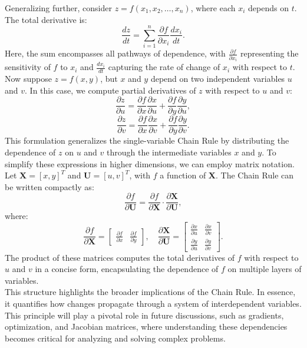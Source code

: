 \noindent Generalizing further, consider \( z = f(x_1, x_2, \ldots, x_n) \), where each \( x_i \) depends on \( t \). The total derivative is:
\[
\frac{dz}{dt} = \sum_{i=1}^n \frac{\partial f}{\partial x_i} \frac{dx_i}{dt}.
\]
Here, the sum encompasses all pathways of dependence, with \( \frac{\partial f}{\partial x_i} \) representing the sensitivity of \( f \) to \( x_i \) and \( \frac{dx_i}{dt} \) capturing the rate of change of \( x_i \) with respect to \( t \). Now suppose \( z = f(x, y) \), but \( x \) and \( y \) depend on two independent variables \( u \) and \( v \). In this case, we compute partial derivatives of \( z \) with respect to \( u \) and \( v \):
\[
\frac{\partial z}{\partial u} = \frac{\partial f}{\partial x} \frac{\partial x}{\partial u} + \frac{\partial f}{\partial y} \frac{\partial y}{\partial u},
\]
\[
\frac{\partial z}{\partial v} = \frac{\partial f}{\partial x} \frac{\partial x}{\partial v} + \frac{\partial f}{\partial y} \frac{\partial y}{\partial v}.
\]
This formulation generalizes the single-variable Chain Rule by distributing the dependence of \( z \) on \( u \) and \( v \) through the intermediate variables \( x \) and \( y \). To simplify these expressions in higher dimensions, we can employ matrix notation. Let \( \mathbf{X} = [x, y]^T \) and \( \mathbf{U} = [u, v]^T \), with \( f \) a function of \( \mathbf{X} \). The Chain Rule can be written compactly as:
\[
\frac{\partial f}{\partial \mathbf{U}} = \frac{\partial f}{\partial \mathbf{X}} \cdot \frac{\partial \mathbf{X}}{\partial \mathbf{U}},
\]
where:
\[
\frac{\partial f}{\partial \mathbf{X}} = \begin{bmatrix} \frac{\partial f}{\partial x} & \frac{\partial f}{\partial y} \end{bmatrix}, \quad
\frac{\partial \mathbf{X}}{\partial \mathbf{U}} = \begin{bmatrix} \frac{\partial x}{\partial u} & \frac{\partial x}{\partial v} \\ \frac{\partial y}{\partial u} & \frac{\partial y}{\partial v} \end{bmatrix}.
\]
The product of these matrices computes the total derivatives of \( f \) with respect to \( u \) and \( v \) in a concise form, encapsulating the dependence of \( f \) on multiple layers of variables. \\

\noindent This structure highlights the broader implications of the Chain Rule. In essence, it quantifies how changes propagate through a system of interdependent variables. This principle will play a pivotal role in future discussions, such as gradients, optimization, and Jacobian matrices, where understanding these dependencies becomes critical for analyzing and solving complex problems.


